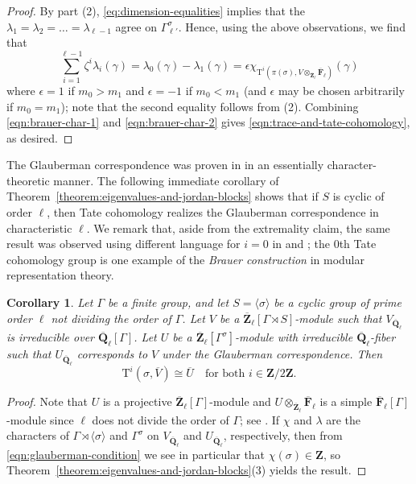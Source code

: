\documentclass[reqno]{amsart}
\numberwithin{equation}{subsection}
\newcommand{\F}{\mathbf{F}}
\newcommand{\Q}{\mathbf{Q}}
\newcommand{\Z}{\mathbf{Z}}
\newcommand{\ol}[1]{\overline{#1}}
\newcommand{\rT}{\ensuremath{\mathrm{T}}\xspace}
\newtheorem{cor}[thm]{Corollary}
\theoremstyle{remark}
\numberwithin{equation}{subsection}
\numberwithin{figure}{subsection}
\begin{document}
\begin{proof}
    By part (2), \eqref{eq:dimension-equalities} implies that the $\lambda_1 = \lambda_2 = \ldots = \lambda_{\ell-1}$ agree on $\Gamma^\sigma_{\ell'}$. Hence, using the above observations, we find that
    \begin{equation}\label{eqn:brauer-char-2}
    \sum_{i=1}^{\ell-1} \zeta^i \lambda_i(\gamma) = \lambda_0(\gamma) - \lambda_1(\gamma) = \epsilon \chi_{\rT^i(\pi(\sigma), V \otimes_{\ol\Z_\ell} \ol\F_\ell)}(\gamma)
    \end{equation}
    where $\epsilon = 1$ if $m_0 > m_1$ and $\epsilon = -1$ if $m_0 < m_1$ (and $\epsilon$ may be chosen arbitrarily if $m_0 = m_1$); note that the second equality follows from (2). Combining \eqref{eqn:brauer-char-1} and \eqref{eqn:brauer-char-2} gives \eqref{eqn:trace-and-tate-cohomology}, as desired.
\end{proof}



The Glauberman correspondence was proven in \cite{Gla68} in an essentially character-theoretic manner. The following immediate corollary of Theorem~\ref{theorem:eigenvalues-and-jordan-blocks} shows that if $S$ is cyclic of order $\ell$, then Tate cohomology realizes the Glauberman correspondence in characteristic $\ell$. We remark that, aside from the extremality claim, the same result was observed using different language for $i = 0$ in \cite{Alp76} and \cite{Dade78}; the $0$th Tate cohomology group is one example of the \emph{Brauer construction} in modular representation theory.

\begin{cor}\label{cor:glauberman-correspondence}
    Let $\Gamma$ be a finite group, and let $S = \langle\sigma\rangle$ be a cyclic group of prime order $\ell$ not dividing the order of $\Gamma$. Let $V$ be a $\ol\Z_\ell[\Gamma \rtimes S]$-module such that $V_{\ol \Q_\ell}$ is irreducible over $\ol\Q_\ell[\Gamma]$.  Let $U$ be a $\ol\Z_\ell[\Gamma^\sigma]$-module with irreducible $\ol\Q_\ell$-fiber such that $U_{\ol \Q_\ell}$ corresponds to $V$ under the Glauberman correspondence.    Then
    \[
    \rT^i(\sigma, \ol V) \cong \ol U \quad \text{for both $i \in \Z/2\Z$.}
    \]
\end{cor}

\begin{proof}
    Note that $U$ is a projective $\ol\Z_\ell[\Gamma]$-module and $U \otimes_{\ol\Z_\ell} \ol\F_\ell$ is a simple $\ol\F_\ell[\Gamma]$-module since $\ell$ does not divide the order of $\Gamma$; see \cite[\S15.5, Proposition~43]{Serre77}. If $\chi$ and $\lambda$ are the characters of $\Gamma \rtimes \langle\sigma\rangle$ and $\Gamma^\sigma$ on $V_{\ol \Q_\ell}$ and $U_{\ol \Q_\ell}$, respectively, then from \eqref{eqn:glauberman-condition} we see in particular that $\chi(\sigma) \in \Z$, so Theorem~\ref{theorem:eigenvalues-and-jordan-blocks}(3) yields the result.
\end{proof}
\end{document}
